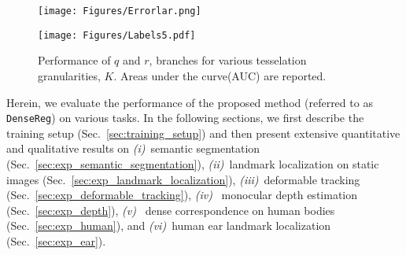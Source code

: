 \documentclass[10pt,twocolumn,letterpaper]{article}
\begin{document}
\begin{figure}[!htb]
    \centering
    \begin{minipage}{.7\linewidth}
        \centering
        \texttt{[image: Figures/Errorlar.png]}
    \end{minipage}%
    \begin{minipage}{0.3\linewidth}
        \centering
        \texttt{[image: Figures/Labels5.pdf]}
    \end{minipage}
    \vspace{-0.35cm}
    \caption{Performance of $q$ and $r$, branches for various tesselation granularities, $K$. Areas under the curve(AUC) are reported.}
    \vspace{-0.15cm}
    \label{fig:exp}
    \vspace{-0.15cm}

\end{figure}
Herein, we evaluate the performance of the proposed method (referred to as \texttt{DenseReg}) on various tasks. 
In the following sections, we first describe the training setup (Sec.~\ref{sec:training_setup}) and then present extensive quantitative and qualitative results on \emph{(i)}~semantic segmentation (Sec.~\ref{sec:exp_semantic_segmentation}), \emph{(ii)}~landmark localization on static images (Sec.~\ref{sec:exp_landmark_localization}), \emph{(iii)}~deformable tracking (Sec.~\ref{sec:exp_deformable_tracking}),  \emph{(iv)}~ monocular depth estimation (Sec.~\ref{sec:exp_depth}), \emph{(v)}~ dense correspondence on human bodies (Sec.~\ref{sec:exp_human}), and \emph{(vi)}~human ear landmark localization (Sec.~\ref{sec:exp_ear}).
\end{document}
